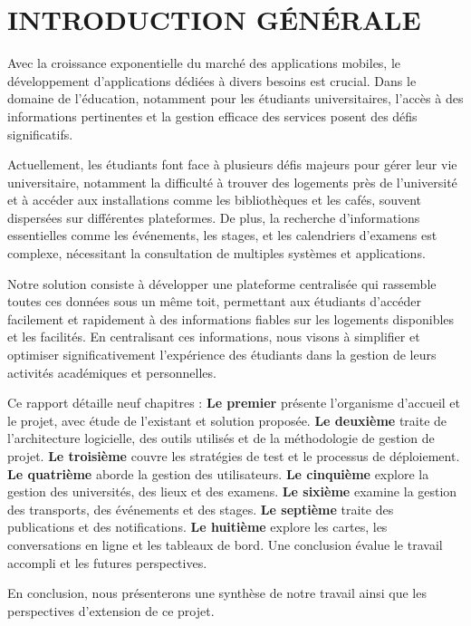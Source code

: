 \chapter*{INTRODUCTION GÉNÉRALE}
\adjustmtc
\thispagestyle{MyStyle}
\begin{sloppypar} 
\vspace{-13mm}
Avec la croissance exponentielle du marché des applications mobiles, le développement d’applications dédiées à divers besoins est crucial. Dans le domaine de l’éducation, notamment pour les étudiants universitaires, l’accès à des informations pertinentes et la gestion efficace des services posent des défis significatifs.

\vspace{-1mm}
Actuellement, les étudiants font face à plusieurs défis majeurs pour gérer leur vie universitaire, notamment la difficulté à trouver des logements près de l'université et à accéder aux installations comme les bibliothèques et les cafés, souvent dispersées sur différentes plateformes. De plus, la recherche d'informations essentielles comme les événements, les stages, et les calendriers d'examens est complexe, nécessitant la consultation de multiples systèmes et applications.

\vspace{-1mm}
Notre solution consiste à développer une plateforme centralisée qui rassemble toutes ces données sous un même toit, permettant aux étudiants d'accéder facilement et rapidement à des informations fiables sur les logements disponibles et les facilités. En centralisant ces informations, nous visons à simplifier et optimiser significativement l'expérience des étudiants dans la gestion de leurs activités académiques et personnelles.

\vspace{-1mm}
Ce rapport détaille neuf chapitres : \textbf{Le premier} présente l’organisme d’accueil et le projet, avec étude de l’existant et solution proposée. \textbf{Le deuxième} traite de l'architecture logicielle, des outils utilisés et de la méthodologie de gestion de projet. \textbf{Le troisième} couvre les stratégies de test et le processus de déploiement. \textbf{Le quatrième} aborde la gestion des utilisateurs. \textbf{Le cinquième} explore la gestion des universités, des lieux et des examens. \textbf{Le sixième} examine la gestion des transports, des événements et des stages. \textbf{Le septième} traite des publications et des notifications. \textbf{Le huitième} explore les cartes, les conversations en ligne et les tableaux de bord. Une conclusion évalue le travail accompli et les futures perspectives.

\vspace{-1mm}
En conclusion, nous présenterons une synthèse de notre travail ainsi que les perspectives d'extension de ce projet.
\end{sloppypar}
\endinput
